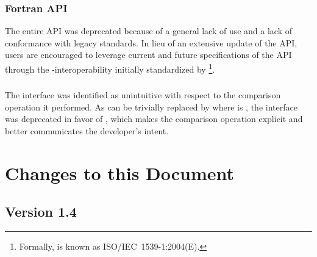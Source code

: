 \subsection{Fortran API}\label{subsec:deprecate-fortran}
The entire \openshmem \Fortran API was deprecated because of a general lack of
use and a lack of conformance with legacy \Fortran standards. In lieu of an
extensive update of the \Fortran API, \Fortran users are encouraged to
leverage current and future \openshmem specifications of the \Cstd API
through the \Fortran-\Cstd interoperability initially standardized by
\Fortran[2003]%
\footnote{Formally, \Fortran[2003] is known as ISO/IEC~1539-1:2004(E).}.

\subsection{}
The  interface was identified as unintuitive with respect to
the comparison operation it performed.  As  can be trivially
replaced by  where  is
, the  interface was deprecated in
favor of , which makes the comparison operation
explicit and better communicates the developer's intent.





\chapter{Changes to this Document}\label{sec:changelog}

\section{Version 1.4}

